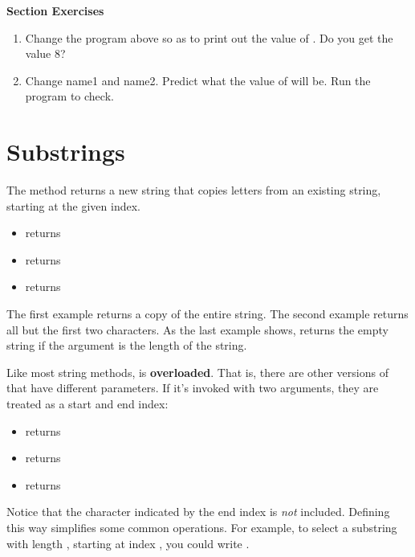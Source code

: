 \textbf{Section Exercises}
\begin{enumerate}
\item Change the  program above so as to print out the value of .  Do you get the value 8?
\item Change name1 and name2.  Predict what the value of  will be.  Run the program to check.
\end{enumerate}


\section{Substrings}


The  method returns a new string that copies letters from an existing string, starting at the given index.

\begin{itemize}
\item {} returns 
\item {} returns 
\item {} returns 
\end{itemize}

The first example returns a copy of the entire string.
The second example returns all but the first two characters.
As the last example shows,  returns the empty string if the argument is the length of the string.

Like most string methods,  is \textbf{overloaded}.
That is, there are other versions of  that have different parameters.
If it's invoked with two arguments, they are treated as a start and end index:

\begin{itemize}
\item {} returns 
\item {} returns 
\item {} returns 
\end{itemize}

Notice that the character indicated by the end index is {\em not} included.
Defining  this way simplifies some common operations.
For example, to select a substring with length , starting at index , you could write .

